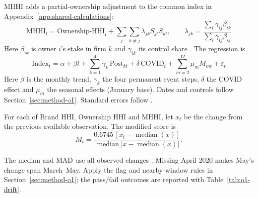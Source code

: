 \label{app:review-o1-formulae}
MHHI adds a partial-ownership adjustment to the common index in Appendix~\ref{app:shared-calculations}:
\begin{equation}
\text{MHHI}_t = \text{Ownership-HHI}_t+\sum_{j}\sum_{k\neq j}\lambda_{jk}S_{jt}S_{kt},\qquad
\lambda_{jk}=\frac{\sum_i \gamma_{ij}\beta_{ik}}{\sum_i \gamma_{ij}\beta_{ij}} \tag{O1.1b}\label{eq:review-o1-mhhi}
\end{equation}
Here $\beta_{ik}$ is owner $i$'s stake in firm $k$ and $\gamma_{ik}$ its control share \parencite{obriensalop2000}. The regression is
\begin{equation}
\text{Index}_t = \alpha + \beta t + \sum_{k=1}^{4}\gamma_k\,\text{Post}_{kt} + \delta\,\text{COVID}_t + \sum_{m=2}^{12}\mu_m M_{mt} + \varepsilon_t \tag{O1.2}\label{eq:review-o1-regression}
\end{equation}
Here $\beta$ is the monthly trend, $\gamma_k$ the four permanent event steps, $\delta$ the COVID effect and $\mu_m$ the seasonal effects (January base). Dates and controls follow Section~\ref{sec:method-o1}. Standard errors follow \textcite{neweywest1987}.
\begin{samepage}
For each of Brand HHI, Ownership HHI and MHHI, let $x_t$ be the change from the previous available observation. The modified score is
\begingroup
\renewcommand{\theHequation}{review-o1-jump}
\begin{equation}
M_t=\frac{0.6745\,[x_t-\operatorname{median}(x)]}{\operatorname{median}|x-\operatorname{median}(x)|}.
\tag{O1.3}\label{eq:review-o1-jump}
\end{equation}
\endgroup
\par\end{samepage}
The median and MAD use all observed changes \parencite{iglewicz1993outliers}. Missing April 2020 makes May's change span March--May. Apply the flag and nearby-window rules in Section~\ref{sec:method-o1}; the pass/fail outcomes are reported with Table~\ref{tab:o1-drift}.
